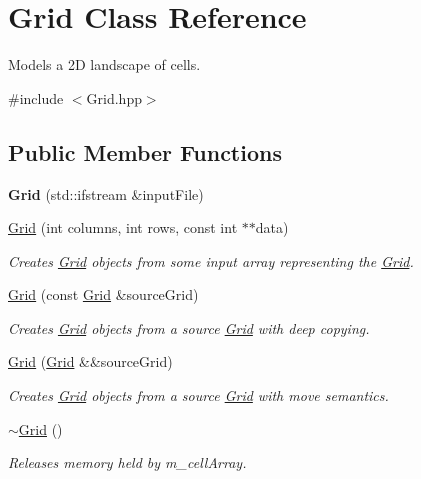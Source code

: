 \hypertarget{class_grid}{}\section{Grid Class Reference}
\label{class_grid}


Models a 2D landscape of cells.  




{\ttfamily \#include $<$Grid.\+hpp$>$}

\subsection*{Public Member Functions}
\begin{DoxyCompactItemize}
\item 
\mbox{\label{class_grid_a88ab1ccc8100827b4da40e62b7b77e96}} 
{\bfseries Grid} (std\+::ifstream \&input\+File)
\item 
\hyperlink{class_grid_a409a82781ea11352ad2615aea0e8cd22}{Grid} (int columns, int rows, const int $\ast$$\ast$data)
\begin{DoxyCompactList}\small\item\em Creates \hyperlink{class_grid}{Grid} objects from some input array representing the \hyperlink{class_grid}{Grid}. \end{DoxyCompactList}\item 
\hyperlink{class_grid_a2be5432331273bc420c252ea09631965}{Grid} (const \hyperlink{class_grid}{Grid} \&source\+Grid)
\begin{DoxyCompactList}\small\item\em Creates \hyperlink{class_grid}{Grid} objects from a source \hyperlink{class_grid}{Grid} with deep copying. \end{DoxyCompactList}\item 
\hyperlink{class_grid_a3828d0bf34f6c97ed93adc84d4ce6c4b}{Grid} (\hyperlink{class_grid}{Grid} \&\&source\+Grid)
\begin{DoxyCompactList}\small\item\em Creates \hyperlink{class_grid}{Grid} objects from a source \hyperlink{class_grid}{Grid} with move semantics. \end{DoxyCompactList}\item 
\hyperlink{class_grid_a3661d0a7f998caaaf8627d7a67072116}{$\sim$\+Grid} ()
\begin{DoxyCompactList}\small\item\em Releases memory held by m\+\_\+cell\+Array. \end{DoxyCompactList}\item 
$$
\end{DoxyCompactItemize}
